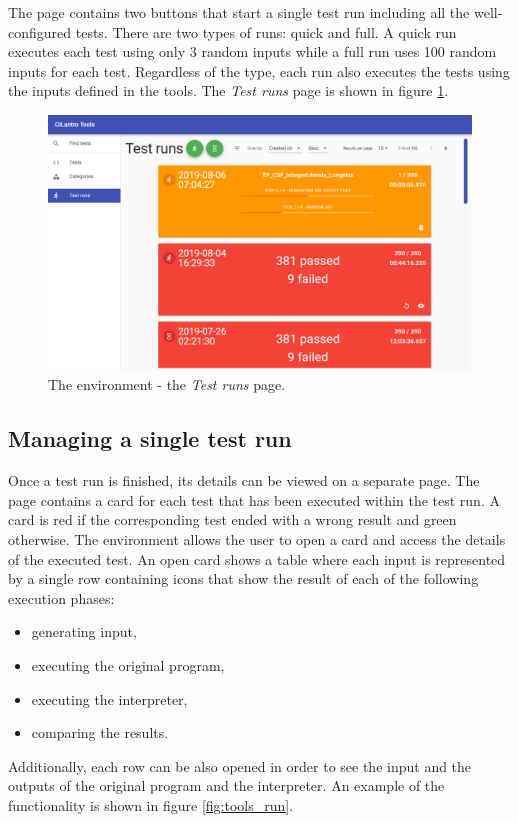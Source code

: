 \documentclass[declaration,shortabstract,english,mgr]{iithesis}
\begin{document}
The page contains two buttons that start a single test run including all the well-configured tests. There are two types of runs: quick and full. A quick run executes each test using only 3 random inputs while a full run uses 100 random inputs for each test. Regardless of the type, each run also executes the tests using the inputs defined in the tools. The \textit{Test runs} page is shown in figure \ref{fig:tools_runs}.

\begin{figure}
	\includegraphics[width=1\textwidth]{tools_runs.png}
    \centering
    \caption{The environment - the \textit{Test runs} page.}
    \label{fig:tools_runs}
\end{figure}

\subsection{Managing a single test run}

Once a test run is finished, its details can be viewed on a separate page. The page contains a card for each test that has been executed within the test run. A card is red if the corresponding test ended with a wrong result and green otherwise. The environment allows the user to open a card and access the details of the executed test. An open card shows a table where each input is represented by a single row containing icons that show the result of each of the following execution phases:
\begin{itemize}
	\item{generating input},
	\item{executing the original program},
	\item{executing the interpreter},
	\item{comparing the results}.
\end{itemize}
Additionally, each row can be also opened in order to see the input and the outputs of the original program and the interpreter. An example of the functionality is shown in figure \ref{fig:tools_run}.
\end{document}

